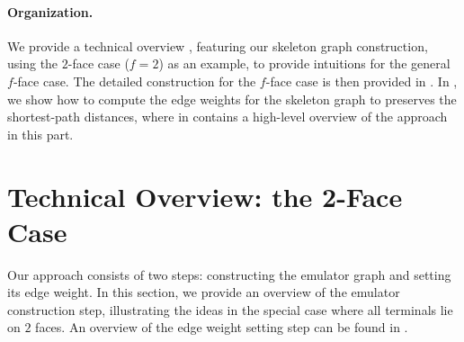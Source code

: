 \documentclass[11pt]{article}
\begin{document}
\paragraph{Organization.} 
We provide a technical overview , featuring our skeleton graph construction, using the $2$-face case ($f=2$) as an example, to provide intuitions for the general $f$-face case. The detailed construction for the $f$-face case is then provided in . In , we show how to compute the edge weights for the skeleton graph to preserves the shortest-path distances, where in  contains a high-level overview of the approach in this part.


\section{Technical Overview: the 2-Face Case}
\label{sec: warmup}

Our approach consists of two steps: constructing the emulator graph and setting its edge weight.
In this section, we provide an overview of the emulator construction step, illustrating the ideas in the special case where all terminals lie on $2$ faces. An overview of the edge weight setting step can be found in  .
\end{document}
